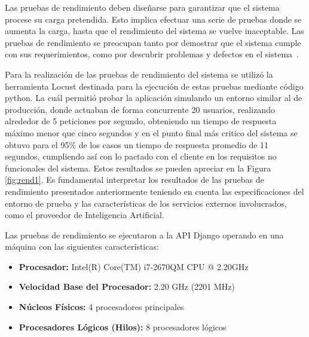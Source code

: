 Las pruebas de rendimiento deben diseñarse para garantizar que el sistema procese su carga pretendida. Esto
implica efectuar una serie de pruebas donde se aumenta la carga, hasta que el rendimiento del sistema se
vuelve inaceptable. Las pruebas de rendimiento se preocupan tanto por demostrar que el sistema cumple
con sus requerimientos, como por descubrir problemas y defectos en el sistema~\cite{sommerville2011software}.

Para la realización de las pruebas de rendimiento del sistema se utilizó la herramienta Locust destinada para
la ejecución de estas pruebas mediante código python. La cuál permitió probar la aplicación simulando un
entorno similar al de producción, donde actuaban de forma concurrente 20 usuarios, realizando alrededor de 5 peticiones por segundo, obteniendo un tiempo de respuesta máximo
menor que cinco segundos y en el punto final más critico del sistema se obtuvo para el 95\% de los casos un tiempo de respuesta promedio de 11 segundos, cumpliendo así con lo pactado con el cliente en los requisitos no funcionales del
sistema. Estos resultados se pueden apreciar en la Figura \ref{fig:rend1}. Es fundamental interpretar los resultados de las pruebas de rendimiento presentados anteriormente teniendo en cuenta las especificaciones del entorno de prueba y las características de los servicios externos involucrados, como el proveedor de Inteligencia Artificial.

Las pruebas de rendimiento se ejecutaron a la API Django operando en una máquina con las siguientes características:

\begin{itemize}
	\item \textbf{Procesador:} Intel(R) Core(TM) i7-2670QM CPU @ 2.20GHz
	\item \textbf{Velocidad Base del Procesador:} 2.20 GHz (2201 MHz)
	\item \textbf{Núcleos Físicos:} 4 procesadores principales
	\item \textbf{Procesadores Lógicos (Hilos):} 8 procesadores lógicos
\end{itemize}

